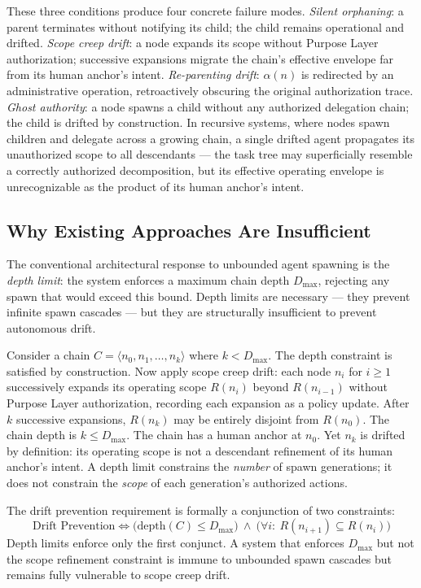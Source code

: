 These three conditions produce four concrete failure modes. \emph{Silent orphaning}: a parent terminates without notifying its child; the child remains operational and drifted. \emph{Scope creep drift}: a node expands its scope without Purpose Layer authorization; successive expansions migrate the chain's effective envelope far from its human anchor's intent. \emph{Re-parenting drift}: $\alpha(n)$ is redirected by an administrative operation, retroactively obscuring the original authorization trace. \emph{Ghost authority}: a node spawns a child without any authorized delegation chain; the child is drifted by construction. In recursive systems, where nodes spawn children and delegate across a growing chain, a single drifted agent propagates its unauthorized scope to all descendants — the task tree may superficially resemble a correctly authorized decomposition, but its effective operating envelope is unrecognizable as the product of its human anchor's intent.

\subsection{Why Existing Approaches Are Insufficient}

The conventional architectural response to unbounded agent spawning is the \emph{depth limit}: the system enforces a maximum chain depth $D_{\max}$, rejecting any spawn that would exceed this bound. Depth limits are necessary — they prevent infinite spawn cascades — but they are structurally insufficient to prevent autonomous drift.

Consider a chain $C = \langle n_0, n_1, \ldots, n_k \rangle$ where $k < D_{\max}$. The depth constraint is satisfied by construction. Now apply scope creep drift: each node $n_i$ for $i \geq 1$ successively expands its operating scope $R(n_i)$ beyond $R(n_{i-1})$ without Purpose Layer authorization, recording each expansion as a policy update. After $k$ successive expansions, $R(n_k)$ may be entirely disjoint from $R(n_0)$. The chain depth is $k \leq D_{\max}$. The chain has a human anchor at $n_0$. Yet $n_k$ is drifted by definition: its operating scope is not a descendant refinement of its human anchor's intent. A depth limit constrains the \emph{number} of spawn generations; it does not constrain the \emph{scope} of each generation's authorized actions.

The drift prevention requirement is formally a conjunction of two constraints:
\begin{equation}
\text{Drift Prevention} \iff \bigl(\text{depth}(C) \leq D_{\max}\bigr)\ \land\ \bigl(\forall i:\ R(n_{i+1}) \subseteq R(n_i)\bigr)
\label{eq:intro-drift-prevention}
\end{equation}
Depth limits enforce only the first conjunct. A system that enforces $D_{\max}$ but not the scope refinement constraint is immune to unbounded spawn cascades but remains fully vulnerable to scope creep drift.

